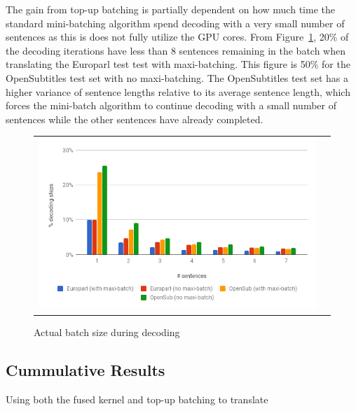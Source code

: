 \documentclass[11pt,a4paper]{article}
\begin{document}
The gain from top-up batching is partially dependent on how much time the standard mini-batching algorithm spend decoding with a very small number of sentences as this is does not fully utilize the GPU cores. From Figure~\ref{fig:batch-size-small}, 20\% of the decoding iterations have less than 8 sentences remaining in the batch when translating the Europarl test test with maxi-batching. This figure is 50\% for the OpenSubtitles test set with no maxi-batching. The OpenSubtitles test set has a higher variance of sentence lengths relative to its average sentence length, which forces the mini-batch algorithm to continue decoding with a small number of sentences while the other sentences have already completed.

\begin{figure}
\centering
\begin{tabular}{cc}
{\includegraphics[scale=0.3]{batch-size-small.png}} 
\end{tabular}
\caption{Actual batch size during decoding}
\label{fig:batch-size-small}
\end{figure} 

\subsection{Cummulative Results}

Using both the fused kernel and top-up batching to translate 
\end{document}
